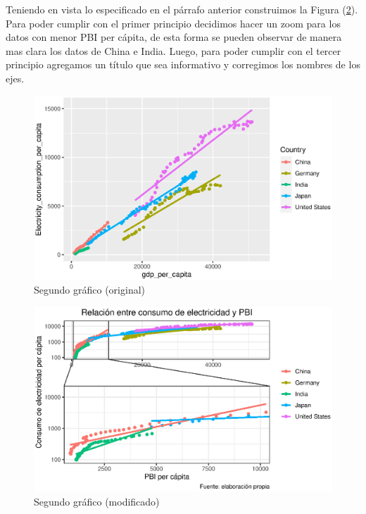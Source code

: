 \documentclass[12pt]{article}
\begin{document}
Teniendo en vista lo especificado en el párrafo anterior construimos la Figura (\ref{segundomod}). Para poder cumplir con el primer principio decidimos hacer un zoom para los datos con menor PBI per cápita, de esta forma se pueden observar de manera mas clara los datos de China e India. Luego, para poder cumplir con el tercer principio agregamos un título que sea informativo y corregimos los nombres de los ejes. 

\begin{figure}[htbp]
    \centering
\includegraphics[width = \textwidth]{graficos/segundografico_original.eps}
    \caption{Segundo gráfico (original)}
    \label{segundooriginal}
\end{figure}

\begin{figure}[htbp]
    \centering
\includegraphics[width = \textwidth]{graficos/segundografico_modificado.eps}
    \caption{Segundo gráfico (modificado)}
    \label{segundomod}
\end{figure}
\end{document}
